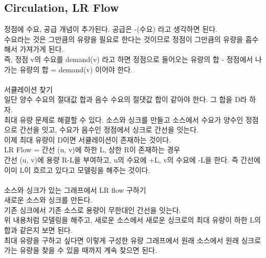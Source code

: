 \documentclass[landscape, 8pt, a4paper, oneside, twocolumn]{extarticle}
\begin{document}
	\subsection {Circulation, LR Flow}
	\noindent
	정점에 수요, 공급 개념이 추가된다. 공급은 -(수요) 라고 생각하면 된다.\\
	수요라는 것은 그만큼의 유량을 필요로 한다는 것이므로 정점이 그만큼의 유량을 흡수해서 가져가게 된다.\\
	즉, 정점 v의 수요를 demand(v) 라고 하면 정점으로 들어오는 유량의 합 - 정점에서 나가는 유량의 합 = demand(v) 이어야 한다.\\\\
	서큘레이션 찾기\\
	일단 양수 수요의 절대값 합과 음수 수요의 절댓값 합이 같아야 한다. 그 합을 D라 하자.\\
	최대 유량 문제로 해결할 수 있다. 소스와 싱크를 만들고 소스에서 수요가 양수인 정점으로 간선을 잇고, 수요가 음수인 정점에서 싱크로 간선을 잇는다.\\
	이제 최대 유량이 D이면 서큘레이션이 존재하는 것이다.\\
	LR Flow = 간선 (u, v)에 하한 L, 상한 R이 존재하는 경우\\
	간선 (u, v)에 용량 R-L을 부여하고, u의 수요에 +L, v의 수요에 -L을 한다. 즉 간선에 이미 L이 흐르고 있다고 모델링을 해주는 것이다.\\\\
	소스와 싱크가 있는 그래프에서 LR flow 구하기\\
	새로운 소스와 싱크를 만든다.\\
	기존 싱크에서 기존 소스로 용량이 무한대인 간선을 잇는다.\\
	위 내용처럼 모델링을 해주고, 새로운 소스에서 새로운 싱크로의 최대 유량이 하한 L의 합과 같은지 보면 된다.\\
	최대 유량을 구하고 싶다면 이렇게 구성한 유량 그래프에서 원래 소스에서 원래 싱크로 가는 유량을 찾을 수 있을 때까지 계속 찾으면 된다.
\end{document}
